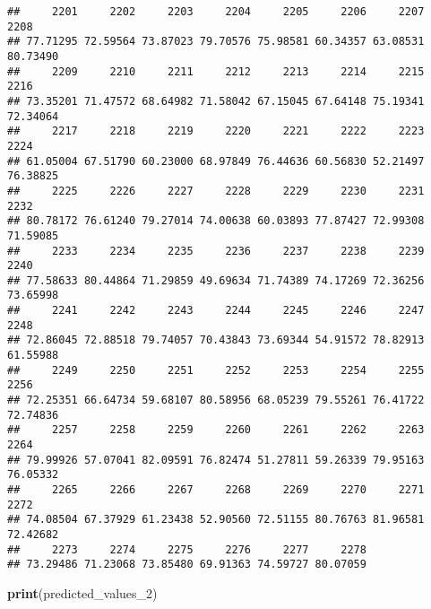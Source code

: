 \documentclass[
]{article}
\newenvironment{Shaded}{\begin{snugshade}}{\end{snugshade}}
\newcommand{\FunctionTok}[1]{\textcolor[rgb]{0.13,0.29,0.53}{\textbf{#1}}}
\newcommand{\NormalTok}[1]{#1}
\begin{document}
\begin{verbatim}
##     2201     2202     2203     2204     2205     2206     2207     2208 
## 77.71295 72.59564 73.87023 79.70576 75.98581 60.34357 63.08531 80.73490 
##     2209     2210     2211     2212     2213     2214     2215     2216 
## 73.35201 71.47572 68.64982 71.58042 67.15045 67.64148 75.19341 72.34064 
##     2217     2218     2219     2220     2221     2222     2223     2224 
## 61.05004 67.51790 60.23000 68.97849 76.44636 60.56830 52.21497 76.38825 
##     2225     2226     2227     2228     2229     2230     2231     2232 
## 80.78172 76.61240 79.27014 74.00638 60.03893 77.87427 72.99308 71.59085 
##     2233     2234     2235     2236     2237     2238     2239     2240 
## 77.58633 80.44864 71.29859 49.69634 71.74389 74.17269 72.36256 73.65998 
##     2241     2242     2243     2244     2245     2246     2247     2248 
## 72.86045 72.88518 79.74057 70.43843 73.69344 54.91572 78.82913 61.55988 
##     2249     2250     2251     2252     2253     2254     2255     2256 
## 72.25351 66.64734 59.68107 80.58956 68.05239 79.55261 76.41722 72.74836 
##     2257     2258     2259     2260     2261     2262     2263     2264 
## 79.99926 57.07041 82.09591 76.82474 51.27811 59.26339 79.95163 76.05332 
##     2265     2266     2267     2268     2269     2270     2271     2272 
## 74.08504 67.37929 61.23438 52.90560 72.51155 80.76763 81.96581 72.42682 
##     2273     2274     2275     2276     2277     2278 
## 73.29486 71.23068 73.85480 69.91363 74.59727 80.07059
\end{verbatim}

\begin{Shaded}
\begin{Highlighting}[]
\FunctionTok{print}\NormalTok{(predicted\_values\_2)}
\end{Highlighting}
\end{Shaded}
\end{document}
